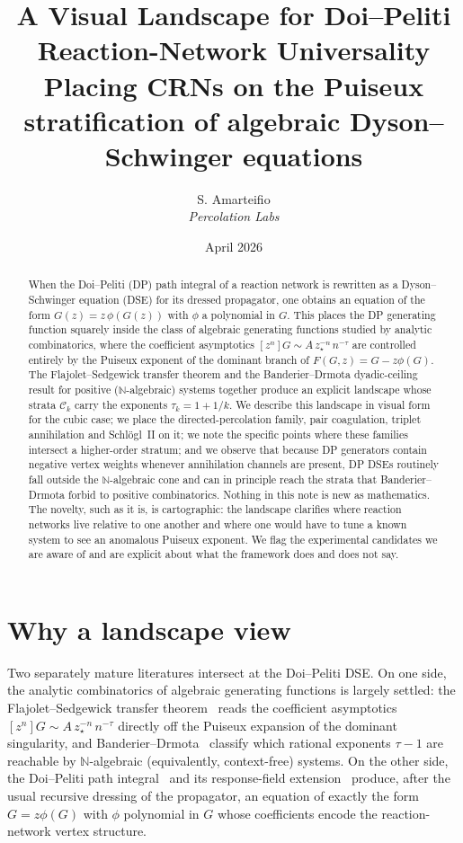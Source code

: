 \documentclass[11pt,a4paper]{article}
\title{A Visual Landscape for Doi--Peliti Reaction-Network Universality\\[4pt]
  \large Placing CRNs on the Puiseux stratification of
  algebraic Dyson--Schwinger equations}
\author{S. Amarteifio\\
  \small\textit{Percolation Labs}}
\date{April 2026}
\newcommand{\NN}{\mathbb{N}}
\newcommand{\Ck}{\mathcal{C}}
\theoremstyle{plain}
\theoremstyle{remark}
\begin{document}
\maketitle

\begin{abstract}
When the Doi--Peliti (DP) path integral of a reaction network is
rewritten as a Dyson--Schwinger equation (DSE) for its dressed
propagator, one obtains an equation of the form
$G(z) = z\,\phi(G(z))$ with $\phi$ a polynomial in $G$.  This
places the DP generating function squarely inside the class of
algebraic generating functions studied by analytic combinatorics,
where the coefficient asymptotics
$[z^{n}]G \sim A\,z_{\star}^{-n}\,n^{-\tau}$ are controlled
entirely by the Puiseux exponent of the dominant branch of
$F(G,z) = G - z\phi(G)$.  The Flajolet--Sedgewick transfer
theorem and the Banderier--Drmota dyadic-ceiling result for
positive ($\NN$-algebraic) systems together produce an explicit
landscape whose strata $\Ck_{k}$ carry the exponents
$\tau_{k} = 1 + 1/k$.  We describe this landscape in visual form
for the cubic case; we place the directed-percolation family,
pair coagulation, triplet annihilation and Schlögl~II on it; we
note the specific points where these families intersect a
higher-order stratum; and we observe that because DP generators
contain negative vertex weights whenever annihilation channels
are present, DP DSEs routinely fall outside the $\NN$-algebraic cone
and can in principle reach the strata that Banderier--Drmota
forbid to positive combinatorics.  Nothing in this note is new
as mathematics.  The novelty, such as it is, is cartographic:
the landscape clarifies where reaction networks live relative
to one another and where one would have to tune a known system
to see an anomalous Puiseux exponent.  We flag the experimental
candidates we are aware of and are explicit about what the
framework does and does not say.
\end{abstract}

\section{Why a landscape view}
\label{sec:why}

Two separately mature literatures intersect at the Doi--Peliti
DSE.  On one side, the analytic combinatorics of algebraic
generating functions is largely settled: the Flajolet--Sedgewick
transfer theorem~\citep{FlajoletSedgewick,FlajoletOdlyzko1990}
reads the coefficient asymptotics
$[z^{n}]G \sim A\,z_{\star}^{-n}\,n^{-\tau}$ directly off the
Puiseux expansion of the dominant singularity, and
Banderier--Drmota~\citep{BanderierDrmota2015} classify which
rational exponents $\tau-1$ are reachable by
$\NN$-algebraic (equivalently, context-free) systems.  On the
other side, the Doi--Peliti path
integral~\citep{Doi1976,Peliti1985,Tauber} and its
response-field extension~\citep{MSR1973,Janssen1976,DeDominicis1976}
produce, after the usual recursive dressing of the propagator,
an equation of exactly the form $G = z\phi(G)$ with $\phi$
polynomial in $G$ whose coefficients encode the reaction-network
vertex structure.
\end{document}
